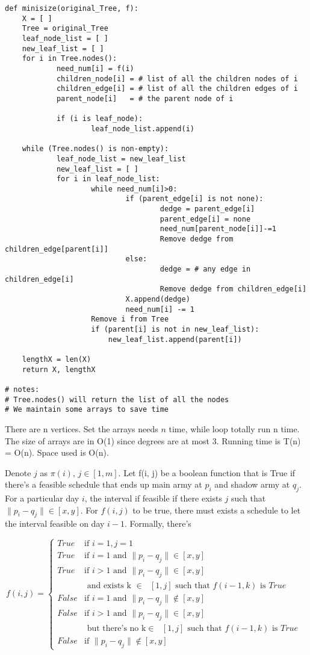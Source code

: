 \documentclass[12pt,a4paper]{article}
\newcommand{\question}[1]{\bigskip\noindent{\textbf{Q{#1} solution}}}
\begin{document}
\begin{lstlisting}
def minisize(original_Tree, f):
	X = [ ]
	Tree = original_Tree
	leaf_node_list = [ ]
	new_leaf_list = [ ]
	for i in Tree.nodes():
		  	need_num[i] = f(i)
			children_node[i] = # list of all the children nodes of i
			children_edge[i] = # list of all the children edges of i
			parent_node[i]   = # the parent node of i

			if (i is leaf_node):
					leaf_node_list.append(i)

	while (Tree.nodes() is non-empty):
			leaf_node_list = new_leaf_list
			new_leaf_list = [ ]
			for i in leaf_node_list:  
					while need_num[i]>0:
							if (parent_edge[i] is not none):
									dedge = parent_edge[i]
									parent_edge[i] = none
									need_num[parent_node[i]]-=1
									Remove dedge from children_edge[parent[i]] 
							else:
									dedge = # any edge in children_edge[i]
							    	Remove dedge from children_edge[i]
							X.append(dedge)
							need_num[i] -= 1
					Remove i from Tree
					if (parent[i] is not in new_leaf_list):
						new_leaf_list.append(parent[i])
			
	lengthX = len(X)
	return X, lengthX

# notes:
# Tree.nodes() will return the list of all the nodes
# We maintain some arrays to save time

\end{lstlisting}
There are n vertices. Set the arrays needs $n$ time, while loop totally run n time. The size of arrays are in O(1) since degrees are at most 3. Running time is T(n) = O(n). Space used is O(n).

\question{21.A}

Denote $j$ as $\pi(i)$, $j \in [1,m]$. Let f(i, j) be a boolean function that is True if there's a feasible schedule that ends up main army at $p_i$ and shadow army at $q_j$. For a particular day $i$, the interval if feasible if there exists $j$ such that $\|p_i - q_j\| \in [x,y]$. For $f(i,j)$ to be true, there must exists a schedule to let the interval feasible on day $i - 1$. Formally, there's 

\begin{equation*}
f(i, j) = 
	\begin{cases}
	True & \mbox{if } i = 1, j = 1 \\
	True & \mbox{if } i = 1 \mbox{ and } \|p_i - q_j\| \in [x,y] \\
	True & \mbox{if } i > 1 \mbox{ and }\|p_i - q_j\| \in [x,y] \\
		& \mbox{ and exists k $\in$ $[1,j]$ such that $f(i - 1, k)$ is $True$} \\
	False & \mbox{if } i = 1 \mbox{ and } \|p_i - q_j\| \notin [x,y] \\
	False & \mbox{if }  i > 1 \mbox{ and } \|p_i - q_j\| \in [x,y] \\
		& \mbox{ but there's no k$\in$ $[1,j]$ such that $f(i - 1, k)$ is $True$ } \\
	False & \mbox{if } \|p_i - q_j\| \notin [x,y]
	\end{cases}
\end{equation*}
\end{document}
